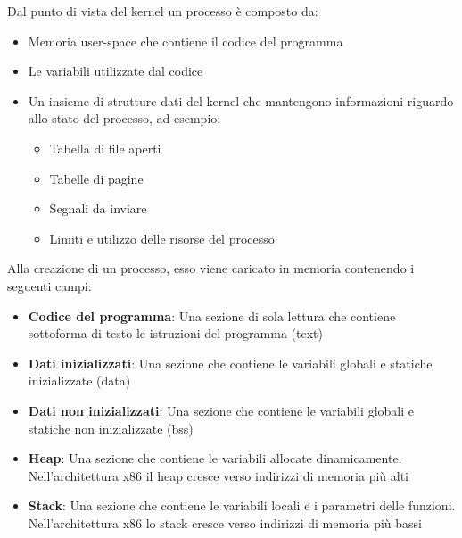 \documentclass[a4paper]{article}
\begin{document}
\vspace{1em}
\noindent
Dal punto di vista del kernel un processo è composto da:
\begin{itemize}
  \item Memoria user-space che contiene il codice del programma
  \item Le variabili utilizzate dal codice
  \item Un insieme di strutture dati del kernel che mantengono informazioni riguardo
    allo stato del processo, ad esempio:
    \begin{itemize}
      \item Tabella di file aperti
      \item Tabelle di pagine
      \item Segnali da inviare
      \item Limiti e utilizzo delle risorse del processo
    \end{itemize}
\end{itemize}
Alla creazione di un processo, esso viene caricato in memoria contenendo i seguenti
campi:
\begin{itemize}
  \item \textbf{Codice del programma}: Una sezione di sola lettura che contiene sottoforma
    di testo le istruzioni del programma (text)
  \item \textbf{Dati inizializzati}: Una sezione che contiene le variabili globali
    e statiche inizializzate (data)
  \item \textbf{Dati non inizializzati}: Una sezione che contiene le variabili globali
    e statiche non inizializzate (bss)
  \item \textbf{Heap}: Una sezione che contiene le variabili allocate dinamicamente.
    Nell'architettura x86 il heap cresce verso indirizzi di memoria più alti
  \item \textbf{Stack}: Una sezione che contiene le variabili locali e i parametri
    delle funzioni. Nell'architettura x86 lo stack cresce verso indirizzi di memoria
    più bassi
\end{itemize}
\end{document}
